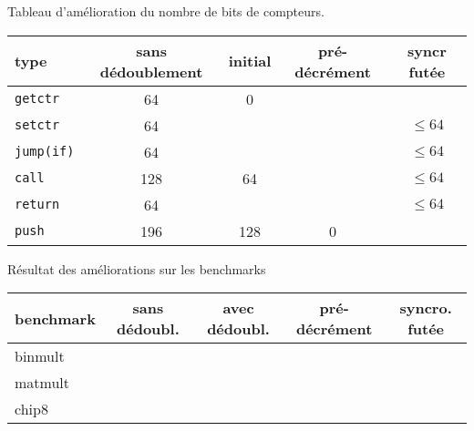 \documentclass[architecture]{compas2018}
\begin{document}
\begin{table}[!h]
\begin{center}
  \end{center}
Tableau d'amélioration du nombre de bits de compteurs.
  \begin{center}
    \begin{tabular}{|l|c|c|c|c|}
      \hline  
      type   & sans dédoublement  & initial         & pré-décrément & syncr futée    \\
      \hline  
      \hline
      \texttt{getctr}     & 64  & 0   &   &   \\
      \hline
      \texttt{setctr}     & 64  &     &   & $\leqslant 64$ \\
      \hline
      \texttt{jump(if)}   & 64  &     &   & $\leqslant 64$ \\
      \hline
      \texttt{call}       & 128 & 64  &   & $\leqslant 64$ \\
      \hline
      \texttt{return}     & 64  &     &   & $\leqslant64$  \\
      \hline
      \texttt{push}       & 196 & 128 & 0 &  \\
      \hline
    \end{tabular}
  \end{center}
  Résultat des améliorations sur les benchmarks
  \begin{center}
    \begin{tabular}{|l|c|c|c|c|}
      
      \hline  
      benchmark   & sans dédoubl.  & avec dédoubl.  & pré-décrément & syncro. futée    \\
      \hline  
      \hline
      binmult & & & &\\
      \hline
      matmult & & & & \\
      \hline
      chip8 & & & &\\
      \hline
    \end{tabular}
  \end{center}

\end{table}
\end{document}
